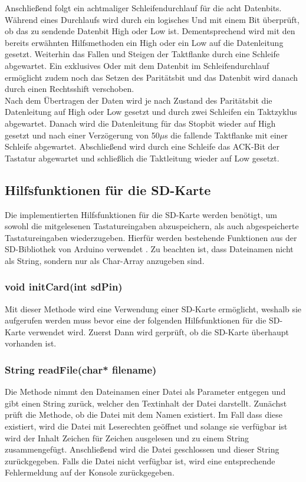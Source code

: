 Anschließend folgt ein achtmaliger Schleifendurchlauf für die acht Datenbits. Während eines Durchlaufs wird durch ein logisches Und mit einem Bit überprüft, ob das zu sendende Datenbit High oder Low ist. Dementsprechend wird mit den bereits erwähnten Hilfsmethoden ein High oder ein Low auf die Datenleitung gesetzt. Weiterhin das Fallen und Steigen der Taktflanke durch eine Schleife abgewartet. Ein exklusives Oder mit dem Datenbit im Schleifendurchlauf ermöglicht zudem noch das Setzen des Paritätsbit und das Datenbit wird danach durch einen Rechtsshift verschoben.
\\

\noindent Nach dem Übertragen der Daten wird je nach Zustand des Paritätsbit die Datenleitung auf High oder Low gesetzt und durch zwei Schleifen ein Taktzyklus abgewartet. Danach wird die Datenleitung für das Stopbit wieder auf High gesetzt und nach einer Verzögerung von 50$\mu$s die fallende Taktflanke mit einer Schleife abgewartet. Abschließend wird durch eine Schleife das ACK-Bit der Tastatur abgewartet und schließlich die Taktleitung wieder auf Low gesetzt.



\subsection{Hilfsfunktionen für die SD-Karte}
Die implementierten Hilfsfunktionen für die SD-Karte werden benötigt, um sowohl die mitgelesenen Tastatureingaben abzuspeichern, als auch abgespeicherte Tastatureingaben wiederzugeben. Hierfür werden bestehende Funktionen aus der SD-Bibliothek von Arduino verwendet \cite{arduino_sd}. Zu beachten ist, dass Dateinamen nicht als String, sondern nur als Char-Array anzugeben sind.

\subsubsection{void initCard(int sdPin)}
Mit dieser Methode wird eine Verwendung einer SD-Karte ermöglicht, weshalb sie aufgerufen werden muss bevor eine der folgenden Hilfsfunktionen für die SD-Karte verwendet wird. Zuerst Dann wird gerprüft, ob die SD-Karte überhaupt vorhanden ist.

\subsubsection{String readFile(char* filename)}
Die Methode nimmt den Dateinamen einer Datei als Parameter entgegen und gibt einen String zurück, welcher den Textinhalt der Datei darstellt. Zunächst prüft die Methode, ob die Datei mit dem Namen existiert. Im Fall dass diese existiert, wird die Datei mit Leserechten geöffnet und solange sie verfügbar ist wird der Inhalt Zeichen für Zeichen ausgelesen und zu einem String zusammengefügt. Anschließend wird die Datei geschlossen und dieser String zurückgegeben. Falls die Datei nicht verfügbar ist, wird eine entsprechende Fehlermeldung auf der Konsole zurückgegeben.

